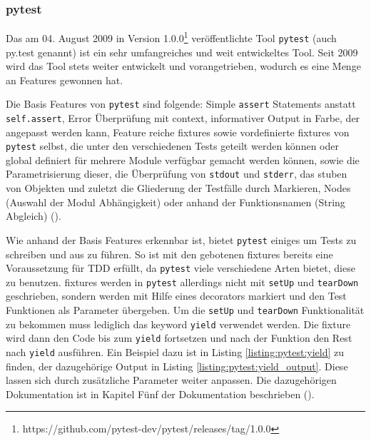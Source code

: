 \subsubsection{pytest}\label{python-tools:pytest}\mbox{}
\newline
Das am 04. August 2009 in Version
1.0.0\footnote{https://github.com/pytest-dev/pytest/releases/tag/1.0.0}
veröffentlichte Tool \lstinline{pytest} (auch py.test genannt)
ist ein sehr umfangreiches und weit entwickeltes Tool. Seit 2009 wird das Tool
stets weiter entwickelt und vorangetrieben, wodurch es eine Menge an Features
gewonnen hat.
\newline

Die Basis Features von \lstinline{pytest} sind folgende:
Simple \lstinline{assert} Statements anstatt \lstinline{self.assert}, Error
Überprüfung mit \Gls{context}, informativer Output in Farbe, der angepasst
werden kann, Feature reiche \Glspl{fixture} sowie vordefinierte \Glspl{fixture}
von \lstinline{pytest} selbst, die unter den verschiedenen Tests geteilt werden
können oder global definiert für mehrere Module verfügbar gemacht werden
können, sowie die Parametrisierung dieser, die Überprüfung von
\lstinline{stdout} und \lstinline{stderr}, das \gls{stub}en von Objekten und
zuletzt die Gliederung der Testfälle durch Markieren, Nodes (Auswahl der Modul
Abhängigkeit) oder anhand der Funktionsnamen (String Abgleich)
(\cite{docs.pytest.org:4.4}).

Wie anhand der Basis Features erkennbar ist, bietet \lstinline{pytest} einiges
um Tests zu schreiben und aus zu führen. So ist mit den gebotenen
\Glspl{fixture} bereits eine Voraussetzung für TDD erfüllt, da
\lstinline{pytest} viele verschiedene Arten bietet, diese zu benutzen.
\Glspl{fixture} werden in \lstinline{pytest} allerdings nicht mit
\lstinline{setUp} und \lstinline{tearDown} geschrieben, sondern werden mit Hilfe
eines \glspl{decorator} markiert und den Test Funktionen als Parameter
übergeben. Um die \lstinline{setUp} und \lstinline{tearDown} Funktionalität zu
bekommen muss lediglich das keyword \lstinline{yield} verwendet werden. Die
\Gls{fixture} wird dann den Code bis zum \lstinline{yield} fortsetzen und nach
der Funktion den Rest nach \lstinline{yield} ausführen. Ein Beispiel dazu ist in
Listing \ref{listing:pytest:yield} zu finden, der dazugehörige Output in
Listing \ref{listing:pytest:yield_output}. Diese lassen sich durch zusätzliche
Parameter weiter anpassen. Die dazugehörigen Dokumentation ist in Kapitel Fünf
der Dokumentation beschrieben (\cite{docs.pytest.org:4.4}).

